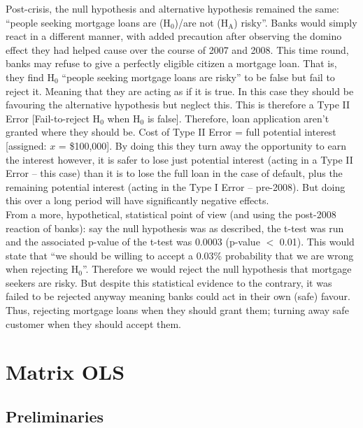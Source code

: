 \documentclass[11pt, english]{article}
\begin{document}
	Post-crisis, the null hypothesis and alternative hypothesis remained the same: ``people seeking mortgage loans are (H$_0$)/are not (H$\mathrm{_A}$) risky''. Banks would simply react in a different manner, with added precaution after observing the domino effect they had helped cause over the course of 2007 and 2008. This time round, banks may refuse to give a perfectly eligible citizen a mortgage loan. That is, they find H$_0$ ``people seeking mortgage loans are risky'' to be false but fail to reject it. Meaning that they are acting as if it is true. In this case they should be favouring the alternative hypothesis but neglect this. This is therefore a Type II Error [Fail-to-reject H$_0$ when H$_0$ is false]. Therefore, loan application aren’t granted where they should be. Cost of Type II Error = full potential interest [assigned: $x$ = \$100,000]. By doing this they turn away the opportunity to earn the interest however, it is safer to lose just potential interest (acting in a Type II Error – this case) than it is to lose the full loan in the case of default, plus the remaining potential interest (acting in the Type I Error – pre-2008). But doing this over a long period will have significantly negative effects.\\

	From a more, hypothetical, statistical point of view (and using the post-2008 reaction of banks): say the null hypothesis was as described, the t-test was run and the associated p-value of the t-test was 0.0003 (p-value $<$ 0.01). This would state that ``we should be willing to accept a 0.03\% probability that we are wrong when rejecting H$_0$''. Therefore we would reject the null hypothesis that mortgage seekers are risky. But despite this statistical evidence to the contrary, it was failed to be rejected anyway meaning banks could act in their own (safe) favour. Thus, rejecting mortgage loans when they should grant them; turning away safe customer when they should accept them.

\newpage

\section{Matrix OLS}

	\subsection{Preliminaries}
\end{document}

